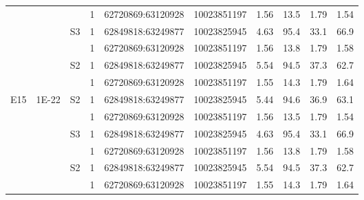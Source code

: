 \documentclass[a4paper,12pt]{article}
\begin{document}
\begin{longtable}{@{\extracolsep{\fill}}llllllllll@{}}
 &  &  & 1 & 62720869:63120928 & 10023851197 & 1.56 & 13.5 & 1.79 & 1.54 \\
 &  & S3 & 1 & 62849818:63249877 & 10023825945 & 4.63 & 95.4 & 33.1 & 66.9 \\
 &  &  & 1 & 62720869:63120928 & 10023851197 & 1.56 & 13.8 & 1.79 & 1.58 \\
 &  & S2 & 1 & 62849818:63249877 & 10023825945 & 5.54 & 94.5 & 37.3 & 62.7 \\
 &  &  & 1 & 62720869:63120928 & 10023851197 & 1.55 & 14.3 & 1.79 & 1.64 \\
E15 & 1E-22 & S2 & 1 & 62849818:63249877 & 10023825945 & 5.44 & 94.6 & 36.9 & 63.1 \\
 &  &  & 1 & 62720869:63120928 & 10023851197 & 1.56 & 13.5 & 1.79 & 1.54 \\
 &  & S3 & 1 & 62849818:63249877 & 10023825945 & 4.63 & 95.4 & 33.1 & 66.9 \\
 &  &  & 1 & 62720869:63120928 & 10023851197 & 1.56 & 13.8 & 1.79 & 1.58 \\
 &  & S2 & 1 & 62849818:63249877 & 10023825945 & 5.54 & 94.5 & 37.3 & 62.7 \\
 &  &  & 1 & 62720869:63120928 & 10023851197 & 1.55 & 14.3 & 1.79 & 1.64 \\
\hline
\end{longtable}
\end{document}
